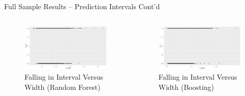 \documentclass{beamer}
\begin{document}
\begin{frame}[t]{Full Sample Results -- Prediction Intervals Cont'd}
\vspace*{-\baselineskip}
\begin{columns}[onlytextwidth]
\begin{figure}
\caption{Falling in Interval Versus Width (Random Forest)}
\includegraphics[scale=0.2]{rf_width_plot}
\end{figure}
\vspace*{-\baselineskip}
\begin{figure}
\caption{Falling in Interval Versus Width (Boosting)}
\includegraphics[scale=0.2]{b_width_plot}
\end{figure}


\end{columns}
\end{frame}
\end{document}

